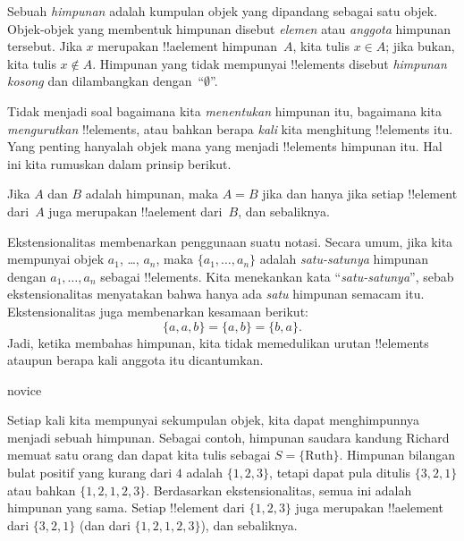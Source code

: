 \documentclass[../../../include/open-logic-section]{subfiles}
\begin{document}

Sebuah \emph{himpunan} adalah kumpulan objek yang dipandang sebagai
satu objek. Objek-objek yang membentuk himpunan disebut \emph{elemen}
atau \emph{anggota} himpunan tersebut. Jika $x$ merupakan !!a{element}
himpunan~$A$, kita tulis $x \in A$; jika bukan, kita tulis $x \notin
A$. Himpunan yang tidak mempunyai !!{element}s disebut \emph{himpunan
kosong} dan dilambangkan dengan~``$\emptyset$''.

\begin{explain}
Tidak menjadi soal bagaimana kita \emph{menentukan} himpunan itu,
bagaimana kita \emph{mengurutkan} !!{element}s, atau bahkan berapa
\emph{kali} kita menghitung !!{element}s itu. Yang penting hanyalah
objek mana yang menjadi !!{element}s himpunan itu. Hal ini kita rumuskan
dalam prinsip berikut.
\end{explain}

\begin{defn}[Ekstensionalitas]
  Jika $A$ dan $B$ adalah himpunan, maka $A = B$ jika dan hanya jika
  setiap !!{element} dari~$A$ juga merupakan !!a{element} dari~$B$,
  dan sebaliknya.
\end{defn}

Ekstensionalitas membenarkan penggunaan suatu notasi. Secara umum,
jika kita mempunyai objek $a_{1}$, \dots, $a_{n}$, maka
$\{a_{1}, \dots, a_{n}\}$ adalah \emph{satu-satunya} himpunan dengan
$a_1, \ldots, a_n$ sebagai !!{element}s. Kita menekankan kata
``\emph{satu-satunya}'', sebab ekstensionalitas menyatakan bahwa hanya
ada \emph{satu} himpunan semacam itu. Ekstensionalitas juga membenarkan
kesamaan berikut:
  \[
    \{a, a, b\} = \{a, b\} = \{b,a\}.
  \]
Jadi, ketika membahas himpunan, kita tidak memedulikan urutan
!!{element}s ataupun berapa kali anggota itu dicantumkan.

\begin{tagblock}{novice}
\begin{ex}
Setiap kali kita mempunyai sekumpulan objek, kita dapat menghimpunnya
menjadi sebuah himpunan. Sebagai contoh, himpunan saudara kandung
Richard memuat satu orang dan dapat kita tulis sebagai
$S=\{\textrm{Ruth}\}$. Himpunan bilangan bulat positif yang kurang dari
$4$ adalah $\{1, 2, 3\}$, tetapi dapat pula ditulis $\{3, 2, 1\}$ atau
bahkan $\{1, 2, 1, 2, 3\}$. Berdasarkan ekstensionalitas, semua ini
adalah himpunan yang sama. Setiap !!{element} dari $\{1, 2, 3\}$ juga
merupakan !!a{element} dari $\{3, 2, 1\}$ (dan dari $\{1, 2, 1, 2,
3\}$), dan sebaliknya.
\end{ex}
\end{tagblock}
\end{document}

